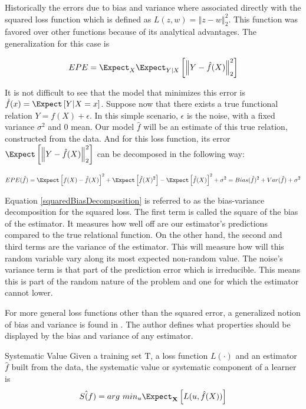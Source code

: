 Historically the errors due to bias and variance where associated directly with the squared loss function which is defined as $L(z,w) = \left\Vert z-w \right\Vert^2_2$. This function was favored over other functions because of its analytical advantages.  The generalization for this case is
 
 \begin{equation}\label{squaredEPE}
 EPE = \Expect_X \Expect_{Y|X} \left[ \left\Vert  Y - \hat{f}(X)  \right\Vert_2^2 \right]
 \end{equation}
 
 It is not difficult to see that the model that minimizes this error is $\hat{f}(x) = \Expect \left[ Y | X=x \right] $. Suppose now that there exists a true functional relation $Y = f(X) + \epsilon$. 
 In this simple scenario, $\epsilon$ is the noise, with a fixed variance $\sigma^2$ and $0$ mean. Our model $\hat{f}$ will be an estimate of this true relation, constructed from the data. And for this loss function, its error $\Expect \left[ \left\Vert Y  - \hat{f}(X) \right\Vert_2^2 \right]$ can be decomposed in the following way:
 
 \begin{equation}\label{squaredBiasDecomposition}
 EPE( \hat{f} ) = \Expect \left[   f(X)  - \hat{f}(X) \right]^2 +  \Expect \left[ \hat{f}(X)^2  \right] - \Expect \left[ \hat{f}(X)  \right]^2  + \sigma^2
 = Bias(\hat{f})^2 + Var(\hat{f}) + \sigma^2
 \end{equation}
 
 Equation \ref{squaredBiasDecomposition} is referred to as the bias-variance decomposition for the squared loss. The first term is called the square of the bias of the estimator. It measures how well off are our estimator's predictions compared to the true relational function. On the other hand, the second and third terms are the variance of the estimator. This will measure how will this random variable vary along its most expected non-random value. The noise's variance term is that part of the prediction error which is irreducible. This means this is part of the random nature of the problem and one for which the estimator cannot lower.
 
 For more general loss functions other than the squared error, a generalized notion of bias and variance is found in \cite{james-biasVarianceGeneral}. The author defines what properties should be displayed by the bias and variance of any estimator. 
 \begin{definition}{Systematic Value}
 	Given a training set $\mathrm{T}$, a loss function $L(\cdot)$ and an estimator $\hat{f}$ built from the data, the systematic value or systematic component of a learner is 
 	$$ S\hat(f)  =  arg \ min_u \Expect_{\textbf{X}} \left[ L(u,\hat{f}(X)) \right]$$
 \end{definition}
 
